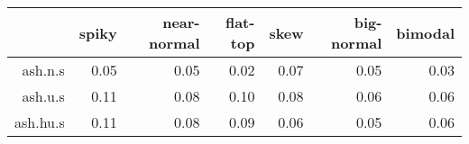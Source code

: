 \begin{tabular}{rrrrrrr}
  \toprule  & spiky & near-normal & flat-top & skew & big-normal & bimodal \\ 
  \midrule ash.n.s & 0.05 & 0.05 & 0.02 & 0.07 & 0.05 & 0.03 \\ 
  ash.u.s & 0.11 & 0.08 & 0.10 & 0.08 & 0.06 & 0.06 \\ 
  ash.hu.s & 0.11 & 0.08 & 0.09 & 0.06 & 0.05 & 0.06 \\ 
   \bottomrule \end{tabular}

